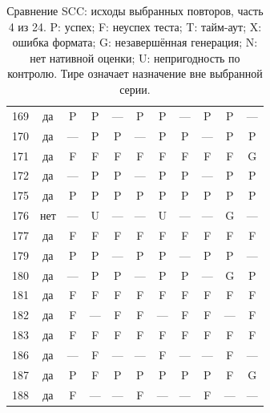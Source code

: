\begin{table}[p]
\begin{tabular*}{\textwidth}{@{\extracolsep{\fill}}rc*{9}{c}@{}}
169 & да & P & P & — & P & P & — & P & P & —\\
170 & да & — & P & P & — & P & P & — & P & P\\
171 & да & F & F & F & F & F & F & F & F & G\\
172 & да & — & P & P & — & P & P & — & P & P\\
175 & да & P & P & P & P & P & P & P & P & P\\
176 & нет & — & U & — & — & U & — & — & G & —\\
177 & да & F & F & F & F & F & F & F & F & F\\
179 & да & P & P & — & P & P & — & P & P & —\\
180 & да & — & P & P & — & P & P & — & G & P\\
181 & да & F & F & F & F & F & F & F & F & F\\
182 & да & F & — & F & F & — & F & F & — & F\\
183 & да & F & F & F & F & F & F & F & F & F\\
186 & да & — & F & — & — & F & — & — & F & —\\
187 & да & P & F & P & P & P & P & P & F & G\\
188 & да & F & — & — & F & — & — & F & — & —\\
\bottomrule\end{tabular*}
\caption{Сравнение SCC: исходы выбранных повторов, часть 4 из 24. P: успех; F: неуспех теста; T: тайм-аут; X: ошибка формата; G: незавершённая генерация; N: нет нативной оценки; U: непригодность по контролю. Тире означает назначение вне выбранной серии.}
\end{table}
\clearpage
